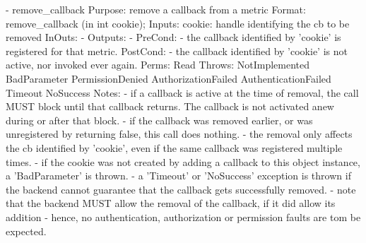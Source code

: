 \begin{myspec}
 
    - remove_callback
      Purpose:  remove a callback from a metric
      Format:   remove_callback    (in  int      cookie);
      Inputs:   cookie:             handle identifying the cb to
                                    be removed
      InOuts:   -
      Outputs:  -
      PreCond:  - the callback identified by 'cookie' is
                  registered for that metric.
      PostCond: - the callback identified by 'cookie' is not
                  active, nor invoked ever again.
      Perms:    Read
      Throws:   NotImplemented
                BadParameter
                PermissionDenied
                AuthorizationFailed
                AuthenticationFailed
                Timeout
                NoSuccess
      Notes:    - if a callback is active at the time of
                  removal, the call MUST block until
                  that callback returns.  The callback is not
                  activated anew during or after that block.
                - if the callback was removed earlier, or
                  was unregistered by returning false, this call
                  does nothing.
                - the removal only affects the cb identified
                  by 'cookie', even if the same callback was
                  registered multiple times.
                - if the cookie was not created by adding a
                  callback to this object instance, a
                  'BadParameter' is thrown.
                - a 'Timeout' or 'NoSuccess' exception is thrown 
                  if the backend cannot guarantee that the 
                  callback gets successfully removed.
                - note that the backend MUST allow the removal of
                  the callback, if it did allow its addition -
                  hence, no authentication, authorization or
                  permission faults are tom be expected.
 

\end{myspec}

